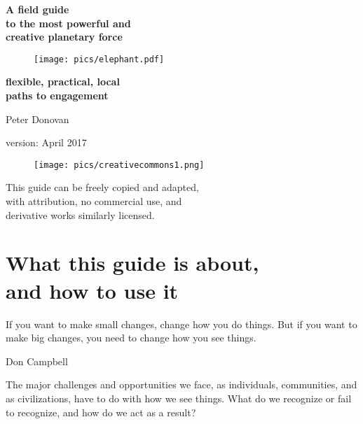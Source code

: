 \documentclass[11pt,letterpaper,twoside,onecolumn]{memoir}
\begin{document}
\frontmatter
\pagestyle{empty}



\begin{center}
\Huge
\bfseries
A field guide\\
to the most powerful and\\
creative planetary force




\begin{figure}[h]
\texttt{[image: pics/elephant.pdf]}
\end{figure}

\vspace*{1em}

\Large
\bfseries
flexible, practical, local\\
paths to engagement

\vspace*{2em}
Peter Donovan




\footnotesize{version: April 2017}
\begin{figure}[h]
\centering
\texttt{[image: pics/creativecommons1.png]}
\end{figure}

This guide can be freely copied and adapted,\\with attribution, no commercial use, and\\derivative works similarly licensed.



\end{center}

\newpage
\thispagestyle{empty}
\setlength{\parindent}{1em}
\setlength{\parskip}{0em}
\normalsize
\setlength{\epigraphwidth}{4in}
\setlength{\epigraphrule}{0pt}
\epigraphfontsize{\small}
\setlength{\beforechapskip}{0em}


\tableofcontents*
\clearpage

\chapter{What this guide is about, \\and how to use it}

\epigraph{If you want to make small changes, change how you do things. But if you want to make big changes, you need to change how you see things.}{Don Campbell}

\noindent The major challenges and opportunities we face, as individuals, communities, and as civilizations, have to do with how we see things. What do we recognize or fail to recognize, and how do we act as a result? 
\end{document}
